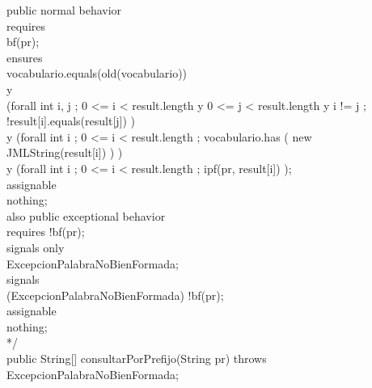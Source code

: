 \documentclass{article}
\begin{document}
{		
     public normal behavior\\
            requires \\
                bf(pr);\\
            ensures \\
                vocabulario.equals(old(vocabulario))\\
	         y\\
		(forall int i, j ; 0 <= i  < result.length
                                     y
				    0 <= j < result.length
				     y
				    i != j
			          ; !result[i].equals(result[j])	 
		)\\
		 y
		(forall int i ; 0 <= i < result.length
                               ; vocabulario.has
                                 (
                                      new JMLString(result[i])
                                 )	 
		)\\
		 y
		(forall int i ; 0 <= i < result.length
                               ; ipf(pr, result[i])	 
		);\\					
	    assignable\\         
                nothing;	\\	
       also public exceptional behavior\\
            requires 
                !bf(pr);\\
            signals only\\ 
                ExcepcionPalabraNoBienFormada;\\
            signals \\
                (ExcepcionPalabraNoBienFormada) !bf(pr);\\
	    assignable \\
                nothing;\\
      */			\\
    public String[] consultarPorPrefijo(String pr) throws \\   
        ExcepcionPalabraNoBienFormada;\\


}
\end{document}
